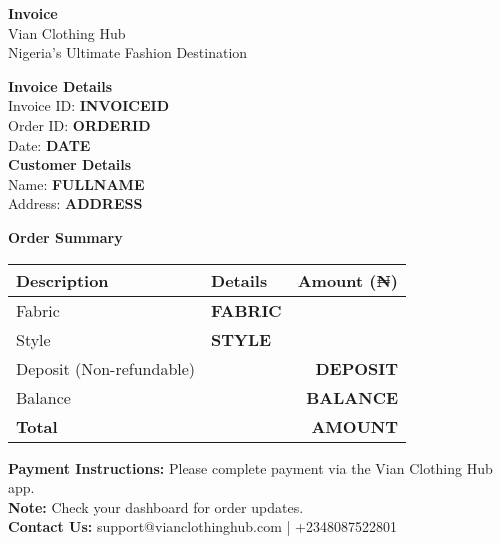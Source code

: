 \documentclass[a4paper,12pt]{article}
\begin{document}
\begin{center}
    {\color{vianpurple}\textbf{\LARGE Invoice}} \\
    \vspace{0.5cm}
    Vian Clothing Hub \\
    Nigeria's Ultimate Fashion Destination \\
    \vspace{0.5cm}
\end{center}

\begin{flushleft}
    \textbf{Invoice Details} \\
    Invoice ID: \textbf{INVOICEID} \\
    Order ID: \textbf{ORDERID} \\
    Date: \textbf{DATE} \\
    \vspace{0.5cm}
    \textbf{Customer Details} \\
    Name: \textbf{FULLNAME} \\
    Address: \textbf{ADDRESS} \\
\end{flushleft}

\begin{center}
    \vspace{0.5cm}
    \textbf{Order Summary}
    \begin{tabular}{llr}
        \toprule
        \textbf{Description} & \textbf{Details} & \textbf{Amount (₦)} \\
        \midrule
        Fabric & \textbf{FABRIC} & \\
        Style & \textbf{STYLE} & \\
        \midrule
        Deposit (Non-refundable) & & \textbf{DEPOSIT} \\
        Balance & & \textbf{BALANCE} \\
        \midrule
        \textbf{Total} & & \textbf{AMOUNT} \\
        \bottomrule
    \end{tabular}
\end{center}

\vspace{1cm}

\begin{flushleft}
    \textbf{Payment Instructions:} Please complete payment via the Vian Clothing Hub app. \\
    \textbf{Note:} Check your dashboard for order updates. \\
    \textbf{Contact Us:} support@vianclothinghub.com | +2348087522801
\end{flushleft}
\end{document}
